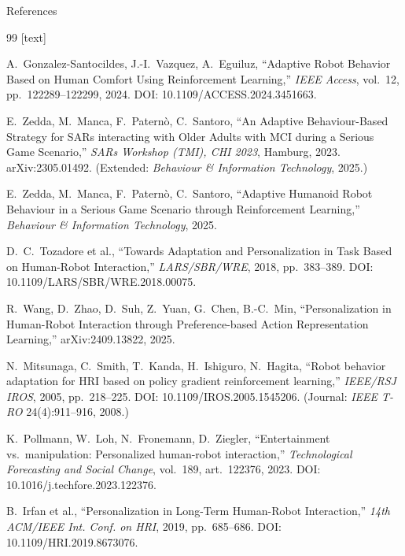 \documentclass[aspectratio=169,10pt]{beamer}
\begin{document}
\begin{frame}[allowframebreaks]{References}
  \footnotesize
  \begin{thebibliography}{99}
    [text]

     A.\ Gonzalez-Santocildes, J.-I.\ Vazquez, A.\ Eguiluz,
      ``Adaptive Robot Behavior Based on Human Comfort Using Reinforcement Learning,''
      \emph{IEEE Access}, vol.\ 12, pp.\ 122289--122299, 2024.
      DOI: 10.1109/ACCESS.2024.3451663.

     E.\ Zedda, M.\ Manca, F.\ Patern\`o, C.\ Santoro,
      ``An Adaptive Behaviour-Based Strategy for SARs interacting with Older Adults with MCI during a Serious Game Scenario,''
      \emph{SARs Workshop (TMI), CHI 2023}, Hamburg, 2023. arXiv:2305.01492.
      (Extended: \emph{Behaviour \& Information Technology}, 2025.)

     E.\ Zedda, M.\ Manca, F.\ Patern\`o, C.\ Santoro,
      ``Adaptive Humanoid Robot Behaviour in a Serious Game Scenario through Reinforcement Learning,''
      \emph{Behaviour \& Information Technology}, 2025.

     D.\ C.\ Tozadore et al.,
      ``Towards Adaptation and Personalization in Task Based on Human-Robot Interaction,''
      \emph{LARS/SBR/WRE}, 2018, pp.\ 383--389.
      DOI: 10.1109/LARS/SBR/WRE.2018.00075.

     R.\ Wang, D.\ Zhao, D.\ Suh, Z.\ Yuan, G.\ Chen, B.-C.\ Min,
      ``Personalization in Human-Robot Interaction through Preference-based Action Representation Learning,''
      arXiv:2409.13822, 2025.

     N.\ Mitsunaga, C.\ Smith, T.\ Kanda, H.\ Ishiguro, N.\ Hagita,
      ``Robot behavior adaptation for HRI based on policy gradient reinforcement learning,''
      \emph{IEEE/RSJ IROS}, 2005, pp.\ 218--225. DOI: 10.1109/IROS.2005.1545206.
      (Journal: \emph{IEEE T-RO} 24(4):911--916, 2008.)

     K.\ Pollmann, W.\ Loh, N.\ Fronemann, D.\ Ziegler,
      ``Entertainment vs.\ manipulation: Personalized human-robot interaction,''
      \emph{Technological Forecasting and Social Change}, vol.\ 189, art.\ 122376, 2023.
      DOI: 10.1016/j.techfore.2023.122376.

     B.\ Irfan et al.,
      ``Personalization in Long-Term Human-Robot Interaction,''
      \emph{14th ACM/IEEE Int. Conf. on HRI}, 2019, pp.\ 685--686.
      DOI: 10.1109/HRI.2019.8673076.


\end{thebibliography}
\end{frame}
\end{document}
